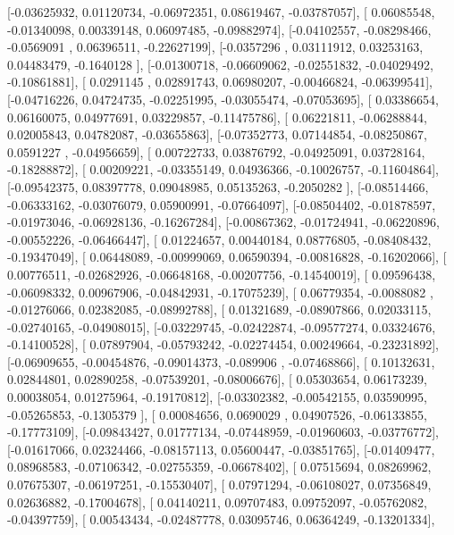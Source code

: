 \documentclass{article}
\begin{document}
       [-0.03625932,  0.01120734, -0.06972351,  0.08619467, -0.03787057],
       [ 0.06085548, -0.01340098,  0.00339148,  0.06097485, -0.09882974],
       [-0.04102557, -0.08298466, -0.0569091 ,  0.06396511, -0.22627199],
       [-0.0357296 ,  0.03111912,  0.03253163,  0.04483479, -0.1640128 ],
       [-0.01300718, -0.06609062, -0.02551832, -0.04029492, -0.10861881],
       [ 0.0291145 ,  0.02891743,  0.06980207, -0.00466824, -0.06399541],
       [-0.04716226,  0.04724735, -0.02251995, -0.03055474, -0.07053695],
       [ 0.03386654,  0.06160075,  0.04977691,  0.03229857, -0.11475786],
       [ 0.06221811, -0.06288844,  0.02005843,  0.04782087, -0.03655863],
       [-0.07352773,  0.07144854, -0.08250867,  0.0591227 , -0.04956659],
       [ 0.00722733,  0.03876792, -0.04925091,  0.03728164, -0.18288872],
       [ 0.00209221, -0.03355149,  0.04936366, -0.10026757, -0.11604864],
       [-0.09542375,  0.08397778,  0.09048985,  0.05135263, -0.2050282 ],
       [-0.08514466, -0.06333162, -0.03076079,  0.05900991, -0.07664097],
       [-0.08504402, -0.01878597, -0.01973046, -0.06928136, -0.16267284],
       [-0.00867362, -0.01724941, -0.06220896, -0.00552226, -0.06466447],
       [ 0.01224657,  0.00440184,  0.08776805, -0.08408432, -0.19347049],
       [ 0.06448089, -0.00999069,  0.06590394, -0.00816828, -0.16202066],
       [ 0.00776511, -0.02682926, -0.06648168, -0.00207756, -0.14540019],
       [ 0.09596438, -0.06098332,  0.00967906, -0.04842931, -0.17075239],
       [ 0.06779354, -0.0088082 , -0.01276066,  0.02382085, -0.08992788],
       [ 0.01321689, -0.08907866,  0.02033115, -0.02740165, -0.04908015],
       [-0.03229745, -0.02422874, -0.09577274,  0.03324676, -0.14100528],
       [ 0.07897904, -0.05793242, -0.02274454,  0.00249664, -0.23231892],
       [-0.06909655, -0.00454876, -0.09014373, -0.089906  , -0.07468866],
       [ 0.10132631,  0.02844801,  0.02890258, -0.07539201, -0.08006676],
       [ 0.05303654,  0.06173239,  0.00038054,  0.01275964, -0.19170812],
       [-0.03302382, -0.00542155,  0.03590995, -0.05265853, -0.1305379 ],
       [ 0.00084656,  0.0690029 ,  0.04907526, -0.06133855, -0.17773109],
       [-0.09843427,  0.01777134, -0.07448959, -0.01960603, -0.03776772],
       [-0.01617066,  0.02324466, -0.08157113,  0.05600447, -0.03851765],
       [-0.01409477,  0.08968583, -0.07106342, -0.02755359, -0.06678402],
       [ 0.07515694,  0.08269962,  0.07675307, -0.06197251, -0.15530407],
       [ 0.07971294, -0.06108027,  0.07356849,  0.02636882, -0.17004678],
       [ 0.04140211,  0.09707483,  0.09752097, -0.05762082, -0.04397759],
       [ 0.00543434, -0.02487778,  0.03095746,  0.06364249, -0.13201334],
\end{document}
